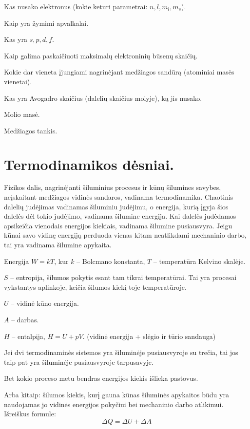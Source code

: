 \begin{remember}
  \item Kas nusako elektronus (kokie keturi parametrai: $n, l, m_{l},
    m_{s}$).
  \item Kaip yra žymimi apvalkalai.
  \item Kas yra $s, p, d, f$.
  \item Kaip galima paskaičiuoti maksimalų elektroninių būsenų skaičių.
  \item Kokie dar vieneta įjungiami nagrinėjant medžiagos sandūrą
    (atominiai masės vienetai).
  \item Kas yra Avogadro skaičius (dalelių skaičius molyje), ką jis nusako.
  \item Molio masė.
  \item Medžiagos tankis.
\end{remember}

\section{Termodinamikos dėsniai.}

Fizikos dalis, nagrinėjanti šiluminius procesus ir kūnų šilumines
savybes, neįskaitant medžiagos vidinės sandaros, vadinama
termodinamika. Chaotinis dalelių judėjimas vadinamas šiluminiu
judėjimu, o energija, kurią įgyja šios dalelės dėl tokio judėjimo,
vadinama šilumine energija. Kai dalelės judėdamos apsikeičia
vienodais energijos kiekiais, vadinama šilumine pusiausvyra.
Jeigu kūnai savo vidinę energiją perduoda vienas kitam neatlikdami
mechaninio darbo, tai yra vadinama šilumine apykaita.

Energija $W = kT$, kur $k$ – Bolcmano konstanta, $T$ – temperatūra
Kelvino skalėje.

$S$ – entropija, šilumos pokytis esant tam tikrai temperatūrai. Tai yra
procesai vykstantys aplinkoje, keičia šilumos kiekį toje temperatūroje.

$U$ – vidinė kūno energija.

$A$ – darbas.

$H$ – entalpija, $H = U + pV$. (vidinė energija + slėgio ir tūrio sandauga)

\begin{defn}
  Jei dvi termodinaminės sistemos yra šiluminėje pusiausvyroje su
  trečia, tai jos taip pat yra šiluminėje pusiausvyroje tarpusavyje.
\end{defn}

\begin{defn}
  Bet kokio proceso metu bendras energijos kiekis išlieka pastovus.

  Arba kitaip: šilumos kiekis, kurį gauna kūnas šiluminės apykaitos
  būdu yra naudojamas jo vidinės energijos pokyčiui bei mechaninio
  darbo atlikimui. Išreiškus formule:
  \begin{equation*}
    \Delta Q = \Delta U + \Delta A
  \end{equation*}
\end{defn}

